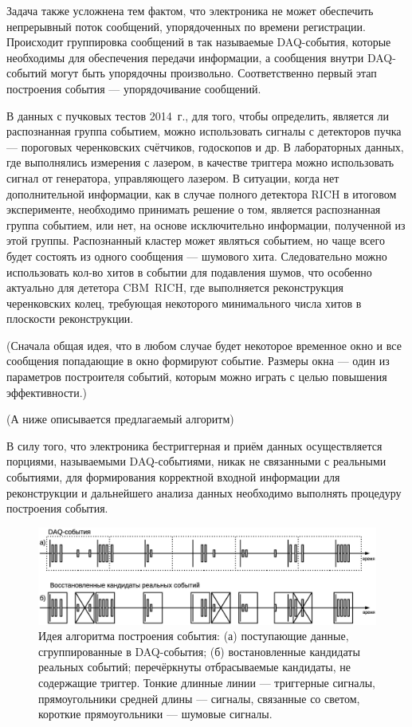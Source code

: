Задача также усложнена тем фактом, что электроника не может обеспечить непрерывный поток сообщений, упорядоченных по времени регистрации. Происходит группировка сообщений в так называемые DAQ-события, которые необходимы для обеспечения передачи информации, а сообщения внутри DAQ-событий могут быть упорядочны произвольно. Соответственно первый этап построения события --- упорядочивание сообщений.

В данных с пучковых тестов 2014~г., для того, чтобы определить, является ли распознанная группа событием, можно использовать сигналы с детекторов пучка --- пороговых черенковских счётчиков, годоскопов и др. В лабораторных данных, где выполнялись измерения с лазером, в качестве триггера можно использовать сигнал от генератора, управляющего лазером. В ситуации, когда нет дополнительной информации, как в случае полного детектора RICH в итоговом эксперименте, необходимо принимать решение о том, является распознанная группа событием, или нет, на основе исключительно информации, полученной из этой группы. Распознанный кластер может являться событием, но чаще всего будет состоять из одного сообщения --- шумового хита. Следовательно можно использовать кол-во хитов в событии для подавления шумов, что особенно актуально для дететора CBM~RICH, где выполняется реконструкция черенковских колец, требующая некоторого минимального числа хитов в плоскости реконструкции.

(Сначала общая идея, что в любом случае будет некоторое временное окно и все сообщения попадающие в окно формируют событие. Размеры окна --- один из параметров построителя событий, которым можно играть с целью повышения эффективности.)

(А ниже описывается предлагаемый алгоритм)

В силу того, что электроника бестриггерная и приём данных осуществляется порциями, называемыми DAQ-событиями, никак не связанными с реальными событиями, для формирования корректной входной информации для реконструкции и дальнейшего анализа данных необходимо выполнять процедуру построения события.

\begin{figure}[H]
\centering
\includegraphics[width=1.0\textwidth]{pictures/15_Event_building_rus_bw.eps}
\caption{Идея алгоритма построения события: (а) поступающие данные, сгруппированные в DAQ-события; (б) востановленные кандидаты реальных событий; перечёркнуты отбрасываемые кандидаты, не содержащие триггер. Тонкие длинные линии --- триггерные сигналы, прямоугольники средней длины --- сигналы, связанные со светом, короткие прямоугольники --- шумовые сигналы.}
\label{fig:EventBuilding}
\end{figure}

